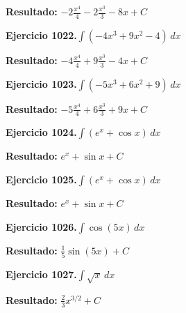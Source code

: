 \documentclass[10pt,a4paper]{article}
\begin{document}
\begin{solbox}
\textbf{Resultado:} \(\displaystyle -2\frac{x^4}{4} -2\frac{x^3}{3} -8x + C\)
\end{solbox}

\begin{ejbox}
\textbf{Ejercicio 1022.}\quad $\int (-4x^3 +9x^2 -4)\,dx$
\end{ejbox}

\begin{solbox}
\textbf{Resultado:} \(\displaystyle -4\frac{x^4}{4} +9\frac{x^3}{3} -4x + C\)
\end{solbox}

\begin{ejbox}
\textbf{Ejercicio 1023.}\quad $\int (-5x^3 +6x^2 +9)\,dx$
\end{ejbox}

\begin{solbox}
\textbf{Resultado:} \(\displaystyle -5\frac{x^4}{4} +6\frac{x^3}{3} +9x + C\)
\end{solbox}

\newpage
\begin{ejbox}
\textbf{Ejercicio 1024.}\quad $\int (e^x + \cos x)\,dx$
\end{ejbox}

\begin{solbox}
\textbf{Resultado:} \(\displaystyle e^x + \sin x + C\)
\end{solbox}

\begin{ejbox}
\textbf{Ejercicio 1025.}\quad $\int (e^x + \cos x)\,dx$
\end{ejbox}

\begin{solbox}
\textbf{Resultado:} \(\displaystyle e^x + \sin x + C\)
\end{solbox}

\begin{ejbox}
\textbf{Ejercicio 1026.}\quad $\int \cos(5x)\,dx$
\end{ejbox}

\begin{solbox}
\textbf{Resultado:} \(\displaystyle \frac{1}{5}\sin(5x) + C\)
\end{solbox}

\newpage
\begin{ejbox}
\textbf{Ejercicio 1027.}\quad $\int \sqrt{x}\,dx$
\end{ejbox}

\begin{solbox}
\textbf{Resultado:} \(\displaystyle \frac{2}{3}x^{3/2} + C\)
\end{solbox}
\end{document}
